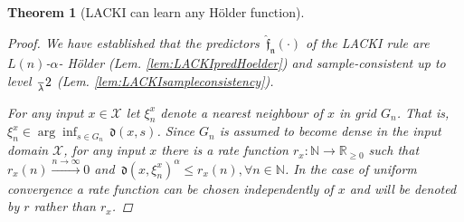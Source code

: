 \documentclass{article} %
\newtheorem{thm}{Theorem}[section]
\theoremstyle{definition}
\theoremstyle{remark}
\newcommand{\Real}{\mathbb R}
\newcommand{\nat}{\mathbb N}
\newcommand{\inspace}{\ensuremath{ \mathcal X}}
\newcommand{\outspace}{\ensuremath{ \mathcal Y}}
\newcommand{\grid}{\ensuremath{  G}}
\newcommand{\metric}{\, \mathfrak{d}} %
\newcommand{\predfn}{\, \mathfrak{  \hat f_n}} %
\newcommand{\hexp}{{ \alpha }}%
\newcommand{\hestthresh}{\ensuremath{ \lambda}}
\newcommand{\obserrbnd}{\bar{\mathfrak e}}
\newcommand{\seq}[2]{\ensuremath{\bigl(#1\bigr)_{#2}}}
\begin{document}
\begin{thm}[LACKI can learn any H\"older function]


\begin{proof}
We have established that the predictors $\predfn(\cdot)$ of the LACKI rule are $L(n)$-$\hexp$- H\"older (Lem. \ref{lem:LACKIpredHoelder}) and sample-consistent up to level $\frac \hestthresh 2$ (Lem. \ref{lem:LACKIsampleconsistency}). 


For any input $x \in \inspace$ let $\xi_n^x$ denote a nearest neighbour of $x$ in grid $\grid_n$. That is, $\xi_n^x \in \arg\inf_{s \in \grid_n} \metric(x,s)$.
Since $\grid_n$ is assumed to become dense in the input domain $\inspace$, for any input $x$ there is a rate function $r_x : \nat \to \Real_{\geq 0}$ such that $r_x(n) \stackrel{n \to \infty}{\longrightarrow} 0$ and $ \metric(x,\xi_n^x )^\hexp \leq r_x(n) 
, \forall n \in \nat$. In the case of uniform convergence a rate function can be chosen independently of $x$ and will be denoted by $r$ rather than $r_x$.


\end{proof}
\end{thm}
\end{document}
